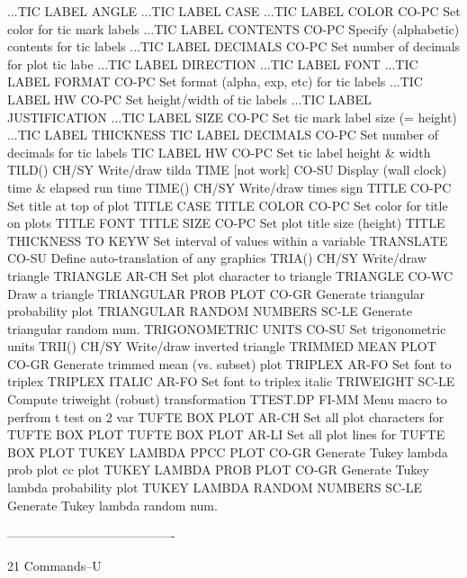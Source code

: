 ...TIC LABEL ANGLE
...TIC LABEL CASE
...TIC LABEL COLOR          CO-PC Set color for tic mark labels
...TIC LABEL CONTENTS       CO-PC Specify (alphabetic) contents for tic labels
...TIC LABEL DECIMALS       CO-PC Set number of decimals for plot tic labe
...TIC LABEL DIRECTION
...TIC LABEL FONT
...TIC LABEL FORMAT         CO-PC Set format (alpha, exp, etc) for tic labels
...TIC LABEL HW             CO-PC Set height/width of tic labels
...TIC LABEL JUSTIFICATION
...TIC LABEL SIZE           CO-PC Set tic mark label size (= height)
...TIC LABEL THICKNESS
TIC LABEL DECIMALS          CO-PC Set number of decimals for tic labels
TIC LABEL HW                CO-PC Set tic label height & width
TILD()                      CH/SY Write/draw tilda
TIME         [not work]     CO-SU Display (wall clock) time & elapsed run time
TIME()                      CH/SY Write/draw times sign
TITLE                       CO-PC Set title at top of plot
TITLE CASE
TITLE COLOR                 CO-PC Set color for title on plots
TITLE FONT
TITLE SIZE                  CO-PC Set plot title size (height)
TITLE THICKNESS
TO                          KEYW  Set interval of values within a variable
TRANSLATE                   CO-SU Define auto-translation of any graphics
TRIA()                      CH/SY Write/draw triangle
TRIANGLE                    AR-CH Set plot character to triangle
TRIANGLE                    CO-WC Draw a triangle
TRIANGULAR PROB PLOT        CO-GR Generate triangular probability plot
TRIANGULAR RANDOM NUMBERS   SC-LE Generate triangular random num.
TRIGONOMETRIC UNITS         CO-SU Set trigonometric units
TRII()                      CH/SY Write/draw inverted triangle
TRIMMED MEAN PLOT           CO-GR Generate trimmed mean (vs. subset) plot
TRIPLEX                     AR-FO Set font to triplex
TRIPLEX ITALIC              AR-FO Set font to triplex italic
TRIWEIGHT                   SC-LE Compute triweight (robust) transformation
TTEST.DP                    FI-MM Menu macro to perfrom t test on 2 var
TUFTE BOX PLOT              AR-CH Set all plot characters for TUFTE BOX PLOT
TUFTE BOX PLOT              AR-LI Set all plot lines for TUFTE BOX PLOT
TUKEY LAMBDA PPCC PLOT      CO-GR Generate Tukey lambda prob plot cc plot
TUKEY LAMBDA PROB PLOT      CO-GR Generate Tukey lambda probability plot
TUKEY LAMBDA RANDOM NUMBERS SC-LE Generate Tukey lambda random num.
 
----------------------------------------
 
21
Commands--U
 
